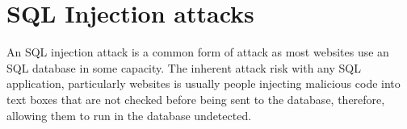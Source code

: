 
\section{SQL Injection attacks} \label{attack2}
An SQL injection attack is a common form of attack as most websites use an SQL database in some capacity. The inherent attack risk with any SQL application, particularly websites is usually people injecting malicious code into text boxes that are not checked before being sent to the database, therefore, allowing them to run in the database undetected.